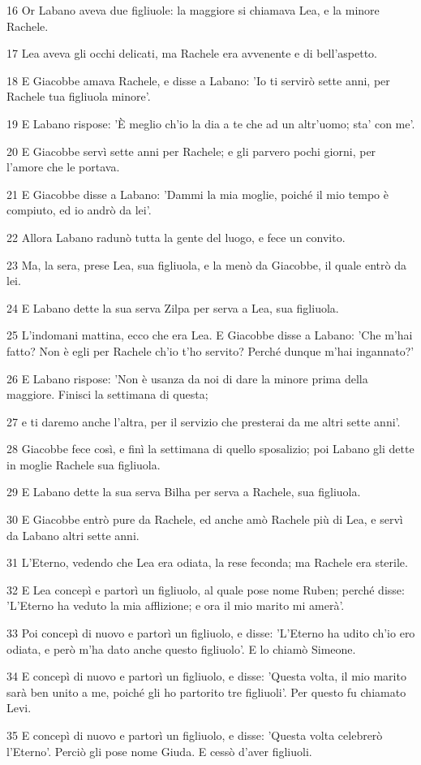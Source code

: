 \par 16 Or Labano aveva due figliuole: la maggiore si chiamava Lea, e la minore Rachele.
\par 17 Lea aveva gli occhi delicati, ma Rachele era avvenente e di bell'aspetto.
\par 18 E Giacobbe amava Rachele, e disse a Labano: 'Io ti servirò sette anni, per Rachele tua figliuola minore'.
\par 19 E Labano rispose: 'È meglio ch'io la dia a te che ad un altr'uomo; sta' con me'.
\par 20 E Giacobbe servì sette anni per Rachele; e gli parvero pochi giorni, per l'amore che le portava.
\par 21 E Giacobbe disse a Labano: 'Dammi la mia moglie, poiché il mio tempo è compiuto, ed io andrò da lei'.
\par 22 Allora Labano radunò tutta la gente del luogo, e fece un convito.
\par 23 Ma, la sera, prese Lea, sua figliuola, e la menò da Giacobbe, il quale entrò da lei.
\par 24 E Labano dette la sua serva Zilpa per serva a Lea, sua figliuola.
\par 25 L'indomani mattina, ecco che era Lea. E Giacobbe disse a Labano: 'Che m'hai fatto? Non è egli per Rachele ch'io t'ho servito? Perché dunque m'hai ingannato?'
\par 26 E Labano rispose: 'Non è usanza da noi di dare la minore prima della maggiore. Finisci la settimana di questa;
\par 27 e ti daremo anche l'altra, per il servizio che presterai da me altri sette anni'.
\par 28 Giacobbe fece così, e finì la settimana di quello sposalizio; poi Labano gli dette in moglie Rachele sua figliuola.
\par 29 E Labano dette la sua serva Bilha per serva a Rachele, sua figliuola.
\par 30 E Giacobbe entrò pure da Rachele, ed anche amò Rachele più di Lea, e servì da Labano altri sette anni.
\par 31 L'Eterno, vedendo che Lea era odiata, la rese feconda; ma Rachele era sterile.
\par 32 E Lea concepì e partorì un figliuolo, al quale pose nome Ruben; perché disse: 'L'Eterno ha veduto la mia afflizione; e ora il mio marito mi amerà'.
\par 33 Poi concepì di nuovo e partorì un figliuolo, e disse: 'L'Eterno ha udito ch'io ero odiata, e però m'ha dato anche questo figliuolo'. E lo chiamò Simeone.
\par 34 E concepì di nuovo e partorì un figliuolo, e disse: 'Questa volta, il mio marito sarà ben unito a me, poiché gli ho partorito tre figliuoli'. Per questo fu chiamato Levi.
\par 35 E concepì di nuovo e partorì un figliuolo, e disse: 'Questa volta celebrerò l'Eterno'. Perciò gli pose nome Giuda. E cessò d'aver figliuoli.

